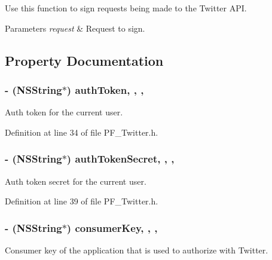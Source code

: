 Use this function to sign requests being made to the Twitter A\+P\+I.


\begin{DoxyParams}{Parameters}
{\em request} & Request to sign. \\
\hline
\end{DoxyParams}


\subsection{Property Documentation}
\hypertarget{interface_p_f___twitter_a2f69919c3b94219d6a2d81746a2557ca}{}
\subsubsection[{auth\+Token}]{\setlength{\rightskip}{0pt plus 5cm}-\/ (N\+S\+String$\ast$) auth\+Token\hspace{0.3cm}{\ttfamily [read]}, {\ttfamily [write]}, {\ttfamily [nonatomic]}, {\ttfamily [copy]}}\label{interface_p_f___twitter_a2f69919c3b94219d6a2d81746a2557ca}
Auth token for the current user. 

Definition at line 34 of file P\+F\+\_\+\+Twitter.\+h.

\hypertarget{interface_p_f___twitter_a9ed4e1e1544a9963d41d0f2df5520123}{}
\subsubsection[{auth\+Token\+Secret}]{\setlength{\rightskip}{0pt plus 5cm}-\/ (N\+S\+String$\ast$) auth\+Token\+Secret\hspace{0.3cm}{\ttfamily [read]}, {\ttfamily [write]}, {\ttfamily [nonatomic]}, {\ttfamily [copy]}}\label{interface_p_f___twitter_a9ed4e1e1544a9963d41d0f2df5520123}
Auth token secret for the current user. 

Definition at line 39 of file P\+F\+\_\+\+Twitter.\+h.

\hypertarget{interface_p_f___twitter_abf8ce099ecc6b1ada8f4e00bdb263344}{}
\subsubsection[{consumer\+Key}]{\setlength{\rightskip}{0pt plus 5cm}-\/ (N\+S\+String$\ast$) consumer\+Key\hspace{0.3cm}{\ttfamily [read]}, {\ttfamily [write]}, {\ttfamily [nonatomic]}, {\ttfamily [copy]}}\label{interface_p_f___twitter_abf8ce099ecc6b1ada8f4e00bdb263344}
Consumer key of the application that is used to authorize with Twitter. 

